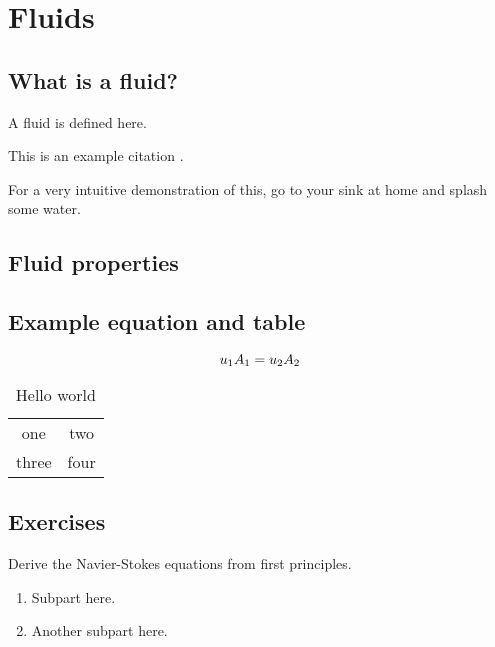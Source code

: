
\chapter{Fluids}
\label{ch:fluids}


\section{What is a fluid?}

\begin{defn}
A fluid is defined here.
\end{defn}

This is an example citation \cite{Janeway:2392}.

\begin{demo} 
For a very intuitive demonstration of this, go to your sink at home and splash some water.
\end{demo}


\section{Fluid properties}

\section{Example equation and table}

\begin{equation}
u_1 A_1 = u_2 A_2
\label{eq:continuity}
\index{equation!continuity}
\end{equation}

\begin{table}
\caption{Hello world}
\begin{center}
\begin{tabular}{cc}
one & two \\
three & four \\
\end{tabular}
\end{center}
\end{table}

\section*{Exercises}
\begin{exercise} 
Derive the Navier-Stokes equations from first principles.
\begin{enumerate}
\item Subpart here.
\item Another subpart here.
\end{enumerate}
\end{exercise}



